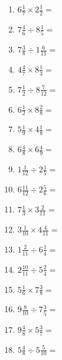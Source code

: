 \documentclass[12pt]{article}
\begin{document}
\begin{enumerate}
\item \large $ 6 \frac{1}{7} \times 2 \frac{1}{2} = $ \vspace{1.6cm}
\item \large $ 7 \frac{4}{6} \div 8 \frac{1}{5} = $ \vspace{1.6cm}
\item \large $ 7 \frac{3}{8} \div 1 \frac{6}{11} = $ \vspace{1.6cm}
\item \large $ 4 \frac{4}{7} \times 8 \frac{1}{3} = $ \vspace{1.6cm}
\newpage
\item \large $ 7 \frac{1}{2} \div 8 \frac{7}{12} = $ \vspace{1.6cm}
\item \large $ 6 \frac{1}{2} \times 8 \frac{2}{8} = $ \vspace{1.6cm}
\item \large $ 5 \frac{1}{9} \times 4 \frac{1}{8} = $ \vspace{1.6cm}
\item \large $ 6 \frac{4}{8} \times 6 \frac{4}{9} = $ \vspace{1.6cm}
\item \large $ 1 \frac{1}{12} \div 2 \frac{1}{5} = $ \vspace{1.6cm}
\item \large $ 6 \frac{11}{12} \div 2 \frac{5}{6} = $ \vspace{1.6cm}
\item \large $ 7 \frac{1}{3} \times 3 \frac{2}{11} = $ \vspace{1.6cm}
\item \large $ 3 \frac{1}{10} \times 4 \frac{4}{11} = $ \vspace{1.6cm}
\item \large $ 1 \frac{2}{11} \div 6 \frac{1}{4} = $ \vspace{1.6cm}
\item \large $ 2 \frac{10}{11} \div 5 \frac{2}{4} = $ \vspace{1.6cm}
\newpage
\item \large $ 5 \frac{1}{6} \times 7 \frac{3}{8} = $ \vspace{1.6cm}
\item \large $ 9 \frac{8}{10} \div 7 \frac{3}{5} = $ \vspace{1.6cm}
\item \large $ 9 \frac{4}{8} \times 5 \frac{3}{7} = $ \vspace{1.6cm}
\item \large $ 5 \frac{4}{8} \div 5 \frac{5}{10} = $ \vspace{1.6cm}

\end{enumerate}
\end{document}

